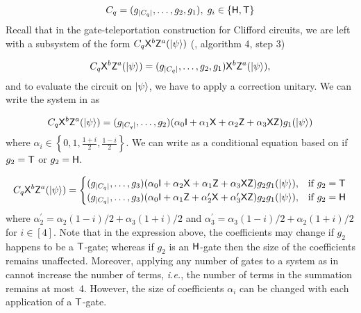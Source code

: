 $$C_q=(g_{|C_q|},\ldots,g_2,g_1 ),\; g_i\in\{{\sf H}, {\sf T}\}$$
Recall that in the gate-teleportation construction for Clifford circuits, we are left with a subsystem of the form $C_q {\sf X}^b{\sf Z}^a ({\lvert}\psi\rangle)$ (, algorithm 4, step 3)

\begin{equation}
\label{eq:pgate4}
C_q {\sf X}^b{\sf Z}^a ({\lvert}\psi\rangle)=(g_{|C_q|},\ldots,g_2,g_1 ){\sf X}^b{\sf Z}^a ({\lvert}\psi\rangle),
\end{equation}
and to evaluate the circuit on ${\lvert}\psi\rangle$, we have to apply a correction unitary. We can write the system in  as

\begin{equation}
\begin{aligned}
\label{eq:pgate5}
C_q {\sf X}^b{\sf Z}^a ({\lvert}\psi\rangle)=(g_{|C_q|},\ldots,g_2)(\alpha_0 {\sf I} +  \alpha_1 {\sf X} + \alpha_2 {\sf Z} + \alpha_3 {\sf X} {\sf Z})g_1 ({\lvert}\psi\rangle)
\end{aligned}
\end{equation}
 where $\alpha_i \in\left\{0,1, \frac{1+i}{2}, \frac{1-i}{2}\right\}.$ We can write    as a conditional equation based on if $g_2={\sf T}$ or $g_2={\sf H}.$

 \begin{equation}
  C_q {\sf X}^b{\sf Z}^a ({\lvert}\psi\rangle)=
\begin{cases}
  (g_{|C_q|},\ldots,g_3)(\alpha_0 {\sf I} +  \alpha_2 {\sf X} + \alpha_1 {\sf Z} + \alpha_3 {\sf X} {\sf Z})g_2g_1 ({\lvert}\psi\rangle), & \text{if } g_2={\sf T}\\
 (g_{|C_q|},\ldots,g_3)(\alpha_0 {\sf I} +  \alpha_1 {\sf Z} + \alpha_2^\prime {\sf X} + \alpha_3^\prime {\sf X} {\sf Z})g_2g_1 ({\lvert}\psi\rangle), & \text{if } g_2={\sf H}\\
\end{cases}
\end{equation}
where $\alpha_2^\prime=\alpha_2(1-i)/2+\alpha_3(1+i)/2$ and $\alpha_3^\prime=\alpha_3(1-i)/2+\alpha_2(1+i)/2$ for $i\in[4].$ Note that in the expression above, the coefficients may change if $g_2$ happens to be a ${\sf T}$-gate;  whereas if $g_2$ is an ${\sf H}$-gate then the size of the coefficients remains unaffected. Moreover, applying any number of gates to a system as in   cannot increase the number of terms, \emph{i.e.}, the number of terms in the summation remains at most~4. However, the size of coefficients $\alpha_i$ can be changed with each application of a ${\sf T}$-gate.


